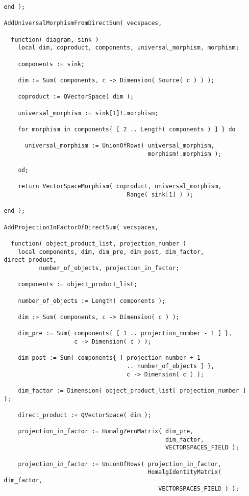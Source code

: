 \begin{small}
\begin{Verbatim}[frame=single]
end );

AddUniversalMorphismFromDirectSum( vecspaces,

  function( diagram, sink )
    local dim, coproduct, components, universal_morphism, morphism;
    
    components := sink;
    
    dim := Sum( components, c -> Dimension( Source( c ) ) );
    
    coproduct := QVectorSpace( dim );
    
    universal_morphism := sink[1]!.morphism;
    
    for morphism in components{ [ 2 .. Length( components ) ] } do
    
      universal_morphism := UnionOfRows( universal_morphism,
                                         morphism!.morphism );
  
    od;
  
    return VectorSpaceMorphism( coproduct, universal_morphism,
                                   Range( sink[1] ) );
  
end );

AddProjectionInFactorOfDirectSum( vecspaces,

  function( object_product_list, projection_number )
    local components, dim, dim_pre, dim_post, dim_factor, direct_product,
          number_of_objects, projection_in_factor;
    
    components := object_product_list;
    
    number_of_objects := Length( components );
    
    dim := Sum( components, c -> Dimension( c ) );
    
    dim_pre := Sum( components{ [ 1 .. projection_number - 1 ] },
                    c -> Dimension( c ) );
    
    dim_post := Sum( components{ [ projection_number + 1 
                                   .. number_of_objects ] },
                                   c -> Dimension( c ) );
    
    dim_factor := Dimension( object_product_list[ projection_number ] );
    
    direct_product := QVectorSpace( dim );
    
    projection_in_factor := HomalgZeroMatrix( dim_pre,
                                              dim_factor,
                                              VECTORSPACES_FIELD );
    
    projection_in_factor := UnionOfRows( projection_in_factor, 
                                         HomalgIdentityMatrix( dim_factor,
                                            VECTORSPACES_FIELD ) );
    

\end{Verbatim}
\end{small}
